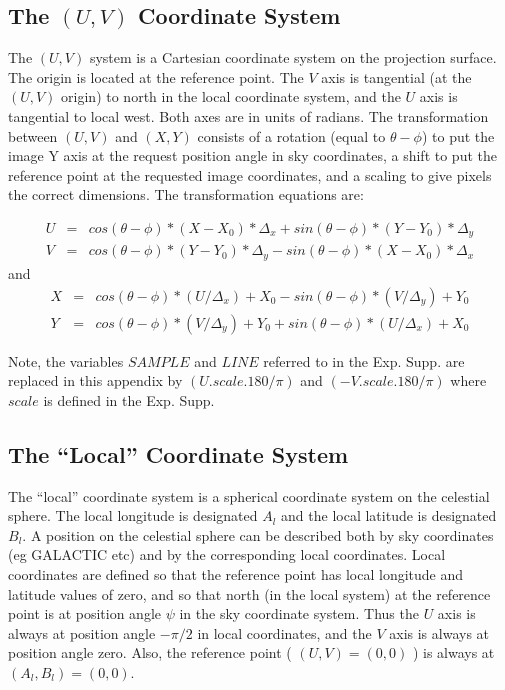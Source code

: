 \subsection {The $(U,V)$ Coordinate System} 
The $(U,V)$ system is a Cartesian coordinate system on the projection surface.
The origin is located at the reference point. The $V$ axis is tangential (at the
$(U,V)$ origin) to north in the local coordinate system, and the $U$ axis is
tangential to local west. Both axes are in units of radians. The transformation
between $(U,V)$ and $(X,Y)$ consists of a rotation (equal to $\theta-\phi$) to
put the image Y axis at the request position angle in sky coordinates, a shift
to put the reference point at the requested image coordinates, and a scaling to
give pixels the correct dimensions. The transformation equations are:

\begin{eqnarray*}
U & = & cos( \theta - \phi )*(X - X_{0})*\Delta_{x} + 
        sin( \theta - \phi )*(Y - Y_{0})*\Delta_{y}\\
V & = & cos( \theta - \phi )*(Y - Y_{0})*\Delta_{y} -
        sin( \theta - \phi )*(X - X_{0})*\Delta_{x}
\end{eqnarray*}
and 
\begin{eqnarray*}
X & = & cos( \theta - \phi )*(U/\Delta_{x}) + X_{0} -
        sin( \theta - \phi )*(V/\Delta_{y}) + Y_{0}\\
Y & = & cos( \theta - \phi )*(V/\Delta_{y}) + Y_{0} +
        sin( \theta - \phi )*(U/\Delta_{x}) + X_{0}
\end{eqnarray*}

Note, the variables $SAMPLE$ and $LINE$ referred to in the Exp. Supp.
are replaced in this appendix by $(U.scale.180/\pi)$ and $(-V.scale.180/\pi)$
where $scale$ is defined in the Exp. Supp. 

\subsection {The ``Local'' Coordinate System} 
The ``local'' coordinate system is a spherical coordinate system on the
celestial sphere. The local longitude is designated $A_{l}$ and the local
latitude is designated $B_{l}$. A position on the celestial sphere can be
described both by sky coordinates (eg GALACTIC etc) and by the corresponding
local coordinates. Local coordinates are defined so that the reference point has
local longitude and latitude values of zero, and so that north (in the local
system) at the reference point is at position angle $\psi$ in the sky coordinate
system. Thus the $U$ axis is always at position angle $-\pi/2$ in local
coordinates, and the $V$ axis is always at position angle zero. Also, the
reference point ( $(U,V)=(0,0)$  ) is always at $(A_{l},B_{l})=(0,0)$. 

